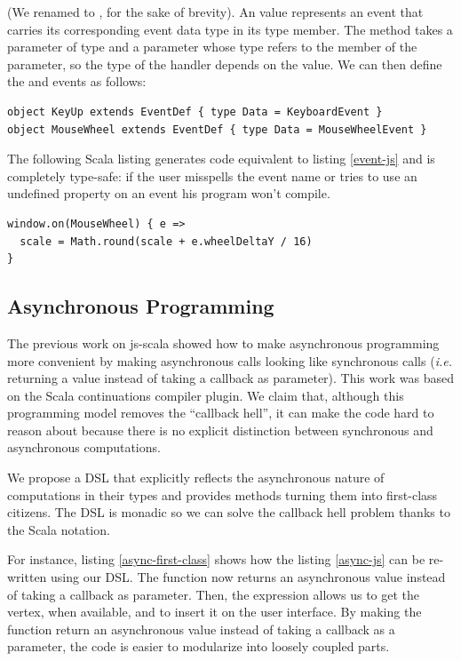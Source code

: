 \documentclass[american,english,runningheads]{llncs}
\newcommand{\ie}{\emph{i.e.}}
\begin{document}
(We renamed  to , for the sake of brevity). An  value represents an
event that carries its corresponding event data type in its  type member. The  method takes a
parameter  of type  and a  parameter whose type refers to the 
member of the  parameter, so the type of the handler depends on the  value. We can then define the
 and  events as follows:

\begin{lstlisting}
object KeyUp extends EventDef { type Data = KeyboardEvent }
object MouseWheel extends EventDef { type Data = MouseWheelEvent }
\end{lstlisting}

The following Scala listing generates code equivalent to listing \ref{event-js} and is completely type-safe: if
the user misspells the event name or tries to use an undefined property on an event his program won’t compile.

\begin{lstlisting}
window.on(MouseWheel) { e =>
  scale = Math.round(scale + e.wheelDeltaY / 16)
}
\end{lstlisting}

\subsection{Asynchronous Programming}

The previous work on js-scala \cite{Kossakowski12_JsDESL} showed how to make asynchronous programming more
convenient by making asynchronous calls looking like synchronous calls (\ie{} returning a value instead of taking a
callback as parameter). This work was based on the Scala continuations compiler plugin. We claim that, although this
programming model removes the “callback hell”, it can make the code hard to reason about because there is no explicit
distinction between synchronous and asynchronous computations.

We propose a DSL that explicitly reflects the asynchronous nature of computations in their types and provides methods
turning them into first-class citizens. The DSL is monadic so we can solve the callback hell problem thanks to the
Scala  notation.

For instance, listing \ref{async-first-class} shows how the listing \ref{async-js} can be re-written using our DSL.
The  function now returns an asynchronous value instead of taking a callback as
parameter. Then, the  expression allows us to get the vertex, when available, and to insert it on the user
interface. By making the  function return an asynchronous value instead of taking a callback as
a parameter, the code is easier to modularize into loosely coupled parts.
\end{document}
